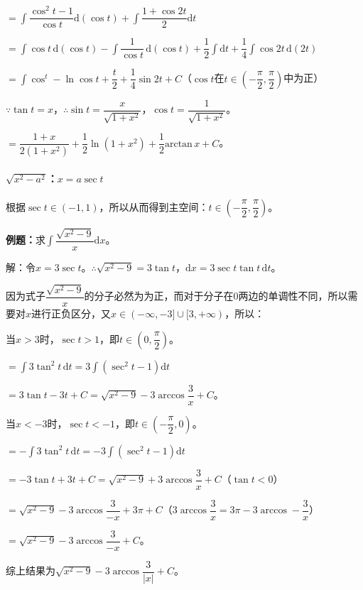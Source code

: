 \documentclass[UTF8, 12pt]{ctexart}
\begin{document}
$=\displaystyle{\int\dfrac{\cos^2t-1}{\cos t}\textrm{d}(\cos t)+\int\dfrac{1+\cos2t}{2}\textrm{d}t}$

$=\displaystyle{\int\cos t\,\textrm{d}(\cos t)-\int\dfrac{1}{\cos t}\,\textrm{d}(\cos t)+\dfrac{1}{2}\int\textrm{d}t+\dfrac{1}{4}\int\cos2t\,\textrm{d}(2t)}$

$=\displaystyle{\int\cos^t-\ln\cos t+\dfrac{t}{2}+\dfrac{1}{4}\sin2t+C}$（$\cos t$在$t\in\left(-\dfrac{\pi}{2},\dfrac{\pi}{2}\right)$中为正）

$\because\tan t=x$，$\therefore\sin t=\dfrac{x}{\sqrt{1+x^2}}$，$\cos t=\dfrac{1}{\sqrt{1+x^2}}$。

$=\dfrac{1+x}{2(1+x^2)}+\dfrac{1}{2}\ln(1+x^2)+\dfrac{1}{2}\textrm{arctan}\,x+C$。

\paragraph{\texorpdfstring{$\sqrt{x^2-a^2}$：$x=a\sec t$}\ } \leavevmode \medskip

根据$\sec t\in(-1,1)$，所以从而得到主空间：$t\in\left(-\dfrac{\pi}{2},\dfrac{\pi}{2}\right)$。\medskip

\textbf{例题：}求$\displaystyle{\int\dfrac{\sqrt{x^2-9}}{x}\textrm{d}x}$。

解：令$x=3\sec t$。$\therefore\sqrt{x^2-9}=3\tan t$，$\textrm{d}x=3\sec t\tan t\,\textrm{d}t$。\medskip

因为式子$\dfrac{\sqrt{x^2-9}}{x}$的分子必然为为正，而对于分子在0两边的单调性不同，所以需要对$x$进行正负区分，又$x\in(-\infty,-3]\cup[3,+\infty)$，所以：

当$x>3$时，$\sec t>1$，即$t\in\left(0,\dfrac{\pi}{2}\right)$。

$=\displaystyle{\int3\tan^2t\,\textrm{d}t=3\int(\sec^2t-1)\textrm{d}t}$

$=3\tan t-3t+C=\sqrt{x^2-9}-3\arccos\dfrac{3}{x}+C$。

当$x<-3$时，$\sec t<-1$，即$t\in\left(-\dfrac{\pi}{2},0\right)$。

$=\displaystyle{-\int3\tan^2t\,\textrm{d}t=-3\int(\sec^2t-1)\textrm{d}t}$

$=-3\tan t+3t+C=\sqrt{x^2-9}+3\arccos\dfrac{3}{x}+C$（$\tan t<0$）

$=\sqrt{x^2-9}-3\arccos\dfrac{3}{-x}+3\pi+C$（$3\arccos\dfrac{3}{x}=3\pi-3\arccos-\dfrac{3}{x}$）

$=\sqrt{x^2-9}-3\arccos\dfrac{3}{-x}+C$。

综上结果为$\sqrt{x^2-9}-3\arccos\dfrac{3}{\vert x\vert}+C$。
\end{document}
